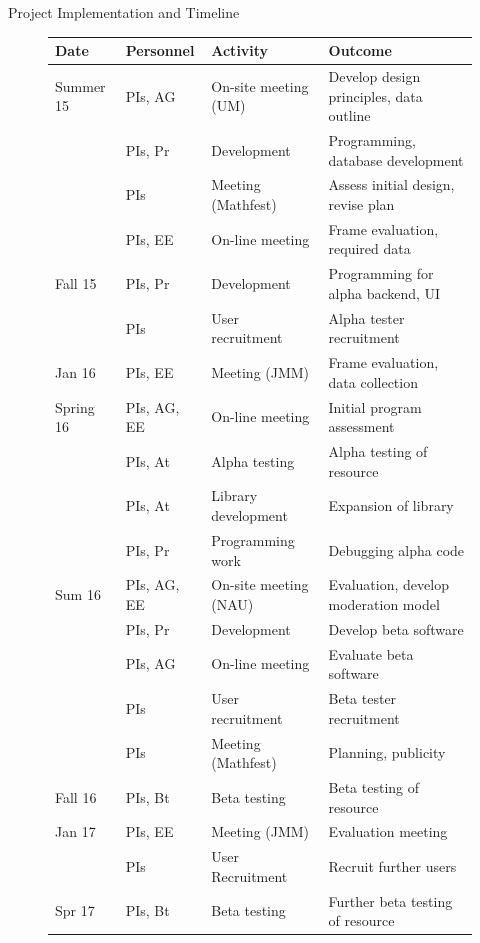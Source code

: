 \documentclass[11pt]{article}
\begin{document}
\begin{section}{Project Implementation and Timeline}
\begin{figure}
\begin{center}
\begin{tabular}{|l|l|l|l|}
  \hline
  \textbf{Date} & \textbf{Personnel} & \textbf{Activity} & \textbf{Outcome}\\
  \hline
  \hline
  Summer 15 & PIs, AG & On-site meeting (UM) & Develop design
        principles, data outline \\
	    & PIs, Pr & Development & Programming, database development \\
	    & PIs & Meeting (Mathfest) & Assess initial design,
        revise plan \\
            & PIs, EE & On-line meeting & Frame evaluation, required data \\
  \hline
  Fall 15 & PIs, Pr & Development & Programming for alpha backend, UI \\
	  & PIs & User recruitment & Alpha tester recruitment \\
  \hline
  Jan 16 & PIs, EE & Meeting (JMM) & Frame evaluation, data collection\\
  \hline
  Spring 16 & PIs, AG, EE & On-line meeting & Initial program assessment \\
            & PIs, At & Alpha testing & Alpha testing of resource \\ 
	    & PIs, At & Library development & Expansion of library \\
            & PIs, Pr & Programming work & Debugging alpha code \\
  \hline 
  Sum 16 & PIs, AG, EE & On-site meeting (NAU) & Evaluation, develop
    moderation model \\ 
	    & PIs, Pr & Development & Develop beta software \\
	    & PIs, AG & On-line meeting & Evaluate beta software \\
	    & PIs & User recruitment & Beta tester recruitment \\
	    & PIs & Meeting (Mathfest) & Planning, publicity \\
  \hline
  Fall 16 %
	    & PIs, Bt & Beta testing & Beta testing of resource \\
  \hline
  Jan 17 & PIs, EE & Meeting (JMM) & Evaluation meeting \\
	    & PIs & User Recruitment & Recruit further users \\
  \hline
  Spr 17 & PIs, Bt & Beta testing & Further beta testing of resource \\

\end{tabular}
\end{center}
\end{figure}
\end{section}
\end{document}
